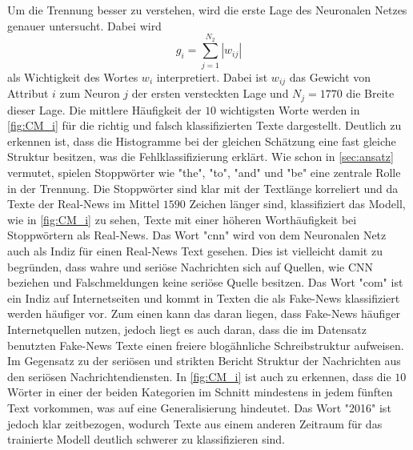 Um die Trennung besser zu verstehen, wird die erste Lage des Neuronalen Netzes genauer untersucht.
Dabei wird
\begin{equation}
    g_i = \sum_{j=1}^{N_2}|w_{ij}|
\end{equation}
als Wichtigkeit des Wortes $w_i$ interpretiert. Dabei ist $w_{ij}$ das Gewicht von Attribut $i$ zum Neuron $j$ der 
ersten versteckten Lage und $N_j=1770$ die Breite dieser Lage.
Die mittlere Häufigkeit der $10$ wichtigsten Worte werden in \autoref{fig:CM_i} für die richtig und falsch klassifizierten 
Texte dargestellt.
Deutlich zu erkennen ist, dass die Histogramme bei der gleichen Schätzung eine fast gleiche Struktur besitzen, was 
die Fehlklassifizierung erklärt.
Wie schon in \autoref{sec:ansatz} vermutet, spielen Stoppwörter wie "the", "to", "and" und "be" eine zentrale Rolle in der Trennung.
Die Stoppwörter sind klar mit der Textlänge korreliert und da Texte der Real-News im Mittel $\num{1590}$ Zeichen 
länger sind, klassifiziert das Modell, wie in \autoref{fig:CM_i} zu sehen, Texte mit einer höheren Worthäufigkeit bei Stoppwörtern 
als Real-News.
Das Wort "cnn" wird von dem Neuronalen Netz auch als Indiz für einen Real-News Text gesehen.
Dies ist vielleicht damit zu begründen, dass wahre und seriöse Nachrichten sich auf Quellen, wie CNN beziehen und 
Falschmeldungen keine seriöse Quelle besitzen.
Das Wort "com" ist ein Indiz auf Internetseiten und kommt in Texten die als Fake-News klassifiziert werden häufiger 
vor.
Zum einen kann das daran liegen, dass Fake-News häufiger Internetquellen nutzen, jedoch liegt es auch daran, dass die 
im Datensatz benutzten Fake-News Texte einen freiere blogähnliche Schreibstruktur aufweisen. 
Im Gegensatz zu der seriösen und strikten Bericht Struktur der Nachrichten aus den seriösen Nachrichtendiensten.
In \autoref{fig:CM_i} ist auch zu erkennen, dass die $10$ Wörter in einer der beiden Kategorien im Schnitt mindestens in 
jedem fünften Text vorkommen, was auf eine Generalisierung hindeutet.
Das Wort "2016" ist jedoch klar zeitbezogen, wodurch Texte aus einem anderen 
Zeitraum für das trainierte Modell deutlich schwerer zu klassifizieren sind. 

